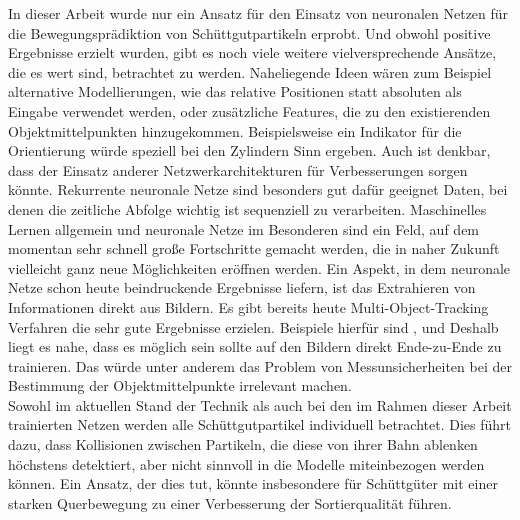 In dieser Arbeit wurde nur ein Ansatz für den Einsatz von neuronalen Netzen für die Bewegungsprädiktion von Schüttgutpartikeln erprobt.
Und obwohl positive Ergebnisse erzielt wurden, gibt es noch viele weitere vielversprechende Ansätze, die es wert sind, betrachtet zu werden.
Naheliegende Ideen wären zum Beispiel alternative Modellierungen, wie das relative Positionen statt absoluten als Eingabe verwendet werden, 
oder zusätzliche Features, die zu den existierenden Objektmittelpunkten hinzugekommen.
Beispielsweise ein Indikator für die Orientierung würde speziell bei den Zylindern Sinn ergeben.
Auch ist denkbar, dass der Einsatz anderer Netzwerkarchitekturen für Verbesserungen sorgen könnte. 
Rekurrente neuronale Netze sind besonders gut dafür geeignet Daten, bei denen die zeitliche Abfolge wichtig ist sequenziell zu verarbeiten.
Maschinelles Lernen allgemein und neuronale Netze im Besonderen sind ein Feld, auf dem momentan sehr schnell große Fortschritte gemacht werden,
die in naher Zukunft vielleicht ganz neue Möglichkeiten eröffnen werden.
Ein Aspekt, in dem neuronale Netze schon heute beindruckende Ergebnisse liefern, ist das Extrahieren von Informationen direkt aus Bildern.
Es gibt bereits heute Multi-Object-Tracking Verfahren die sehr gute Ergebnisse erzielen. 
Beispiele hierfür sind \cite{Milan2017}, \cite{son2017multi} und \cite{ning2017spatially}
Deshalb liegt es nahe, dass es möglich sein sollte auf den Bildern direkt Ende-zu-Ende zu trainieren.
Das würde unter anderem das Problem von Messunsicherheiten bei der Bestimmung der Objektmittelpunkte irrelevant machen.\\
Sowohl im aktuellen Stand der Technik als auch bei den im Rahmen dieser Arbeit trainierten Netzen werden alle Schüttgutpartikel individuell betrachtet.
Dies führt dazu, dass Kollisionen zwischen Partikeln, die diese von ihrer Bahn ablenken höchstens detektiert, aber nicht sinnvoll in die Modelle miteinbezogen werden können.
Ein Ansatz, der dies tut, könnte insbesondere für Schüttgüter mit einer starken Querbewegung zu einer Verbesserung der Sortierqualität führen.


